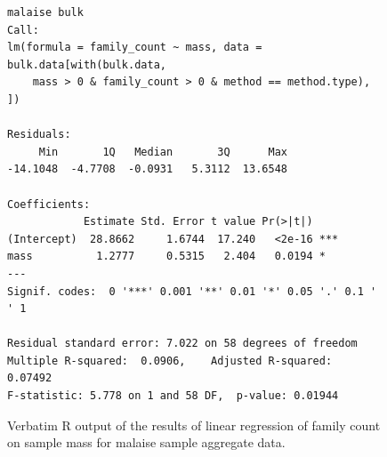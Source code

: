 \documentclass[10pt,letterpaper,twocolumn]{article}
\begin{document}
\begin{figure}[h]
	\lstset{numbers=left}
	\lstset{xleftmargin=5mm,framexleftmargin=5mm}
	\begin{lstlisting}
malaise bulk
Call:
lm(formula = family_count ~ mass, data = bulk.data[with(bulk.data, 
    mass > 0 & family_count > 0 & method == method.type), ])

Residuals:
     Min       1Q   Median       3Q      Max 
-14.1048  -4.7708  -0.0931   5.3112  13.6548 

Coefficients:
            Estimate Std. Error t value Pr(>|t|)    
(Intercept)  28.8662     1.6744  17.240   <2e-16 ***
mass          1.2777     0.5315   2.404   0.0194 *  
---
Signif. codes:  0 '***' 0.001 '**' 0.01 '*' 0.05 '.' 0.1 ' ' 1

Residual standard error: 7.022 on 58 degrees of freedom
Multiple R-squared:  0.0906,	Adjusted R-squared:  0.07492 
F-statistic: 5.778 on 1 and 58 DF,  p-value: 0.01944
	\end{lstlisting}
	\caption{Verbatim R output of the results of linear regression of family count on sample mass for malaise sample aggregate data.}
	\label{fig:bulk_malaise_lm}
	\smallskip
	\nointerlineskip
	\hrulefill
\end{figure}
\end{document}
